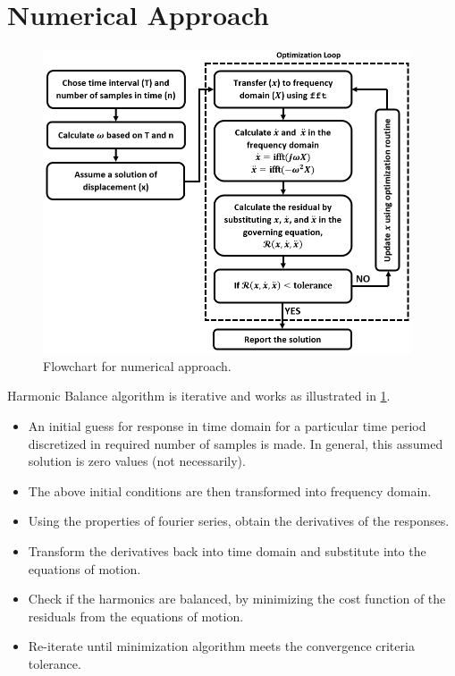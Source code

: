 \documentclass[12pt, a4paper]{extarticle}
\begin{document}
\section{Numerical Approach}

\begin{figure}[h]
	\centering
	\includegraphics[height=9.00cm]{figure/minimize_residual.png}
	\caption{Flowchart for numerical approach.}
	\label{fig:flowchart}
\end{figure}

Harmonic Balance algorithm is iterative and works as illustrated in \ref{fig:flowchart}.
\begin{itemize}
\item An initial guess for response in time domain for a particular time period discretized in required number of samples is made. In general, this assumed solution is zero values (not necessarily).
\item The above initial conditions are then transformed into frequency domain. 
\item Using the properties of fourier series, obtain the derivatives of the responses.
\item Transform the derivatives back into time domain and substitute into the equations of motion.
\item Check if the harmonics are balanced, by minimizing the cost function of the residuals from the equations of motion. 
\item Re-iterate until minimization algorithm meets the convergence criteria tolerance.
\end{itemize}

\end{document}
